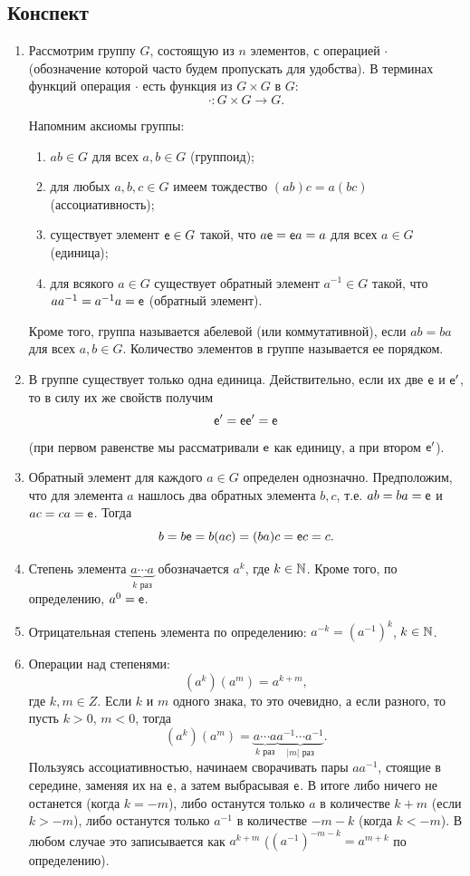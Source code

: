 \subsection*{Конспект}

\begin{enumerate}
\item Рассмотрим группу $G$, состоящую из $n$ элементов, с операцией $\cdot$ (обозначение которой часто будем пропускать для удобства). В терминах функций операция $\cdot$ есть функция из $G\times G$ в $G$:
$$
\cdot: G\times G\to G.
$$

Напомним аксиомы группы:
\begin{enumerate}[G1]
\item $ab\in G$ для всех $a,b\in G$ (группоид);
\item для любых $a,b,c\in G$ имеем тождество $(ab)c=a(bc)$ (ассоциативность);
\item существует элемент $\mathsf e\in G$ такой, что $a\mathsf e=\mathsf e a=a$ для всех $a\in G$ (единица);
\item для всякого $a\in G$ существует обратный элемент $a^{-1}\in G$ такой, что $aa^{-1}=a^{-1}a=\mathsf e$ (обратный элемент).
\end{enumerate}
Кроме того, группа называется абелевой (или коммутативной), если $ab=ba$ для всех $a,b\in G$. Количество элементов в группе называется ее порядком.
\item В группе существует только одна единица. Действительно, если их две $\mathsf e$ и $\mathsf e'$, то в силу их же свойств получим
$$
\mathsf e' = \mathsf e\mathsf e' = \mathsf e
$$
(при первом равенстве мы рассматривали $\mathsf e$ как единицу, а при втором $\mathsf e'$).
\item Обратный элемент для каждого $a\in G$ определен однозначно. Предположим, что для элемента $a$ нашлось два обратных элемента $b,c$, т.е. $ab=ba=\mathsf e$ и $ac=ca=\mathsf e$. Тогда
$$
b=b\mathsf e=b(ac)=(ba)c=\mathsf e c=c.
$$
\item Степень элемента $\underbrace{a\cdots a}_{k\mbox{ раз}}$ обозначается $a^k$, где $k\in\mathbb N$. Кроме того, по определению, $a^0=\mathsf e$.
\item Отрицательная степень элемента по определению: $a^{-k}=(a^{-1})^k$, $k\in\mathbb N$.
\item Операции над степенями:
$$
(a^k)(a^m)=a^{k+m},
$$
где $k,m\in Z$. Если $k$ и $m$ одного знака, то это очевидно, а если разного, то пусть $k>0$, $m<0$, тогда
$$
(a^k)(a^m) = \underbrace{a\cdots a}_{k\mbox{ раз}}\underbrace{a^{-1}\cdots a^{-1}}_{|m|\mbox{ раз}}.
$$
Пользуясь ассоциативностью, начинаем сворачивать пары $aa^{-1}$, стоящие в середине, заменяя их на $\mathsf e$, а затем выбрасывая $\mathsf e$. В итоге либо ничего не останется (когда $k=-m$), либо останутся только $a$ в количестве $k+m$ (если $k>-m$), либо останутся только $a^{-1}$ в количестве $-m-k$ (когда $k<-m$). В любом случае это записывается как $a^{k+m}$ ($(a^{-1})^{-m-k}=a^{m+k}$ по определению).


\end{enumerate}
